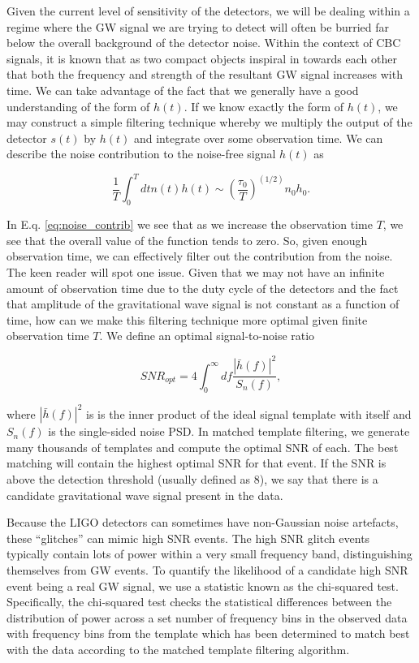Given the current level of sensitivity of the detectors, we will be dealing within a regime where the \ac{GW} signal we are trying to detect will often be burried far below the overall background of the detector noise. Within the context of \ac{CBC} signals, it is known that as two compact objects inspiral in towards each other that both the frequency and strength of the resultant \ac{GW} signal increases with time. We can take advantage of the fact that we generally have a good understanding of the form of $h(t)$. If we know exactly the form of $h(t)$, we may construct a simple filtering technique whereby we multiply the output of the detector $s(t)$ by $h(t)$ and integrate over some observation time. We can describe the noise contribution to the noise-free signal $h(t)$ as 

\begin{equation} \label{eq:noise_contrib}
    \frac{1}{T} \int_0^T dt n(t) h(t) \sim (\frac{\tau_{0}}{T})^{(1/2)} n_{0} h_{0}.
\end{equation}{}

In E.q. \ref{eq:noise_contrib} we see that as we increase the observation time $T$, we see that the overall value of the function tends to zero. So, given enough observation time, we can effectively filter out the contribution from the noise. The keen reader will spot one issue. Given that we may not have an infinite amount of observation time due to the duty cycle of the detectors and the fact that amplitude of the gravitational wave signal is not constant as a function of time, how can we make this filtering technique more optimal given finite observation time $T$. We define an optimal signal-to-noise ratio

\begin{equation}
    SNR_{opt} = 4 \int_0^{\infty} df \frac{|\bar{h}(f)|^2}{S_{n}(f)},
\end{equation}{}

where $|\bar{h}(f)|^2$ is is the inner product of the ideal signal template with itself and $S_{n}(f)$ is the single-sided noise \ac{PSD}. In matched template filtering, we generate many thousands of templates and compute the optimal \ac{SNR} of each. The best matching will contain the highest optimal \ac{SNR} for that event. If the \ac{SNR} is above the detection threshold (usually defined as 8), we say that there is a candidate gravitational wave signal present in the data.

%
%
Because the \ac{LIGO} detectors can sometimes have non-Gaussian noise artefacts, these ``glitches'' can mimic high \ac{SNR} events. The high \ac{SNR} glitch events typically contain lots of power within a very small frequency band, distinguishing themselves from \ac{GW} events. To quantify the likelihood of a candidate high \ac{SNR} event being a real \ac{GW} signal, we use a statistic known as the chi-squared test. Specifically, the chi-squared test checks the statistical differences between the distribution of power across a set number of frequency bins in the observed data with frequency bins from the template which has been determined to match best with the data according to the matched template filtering algorithm.

